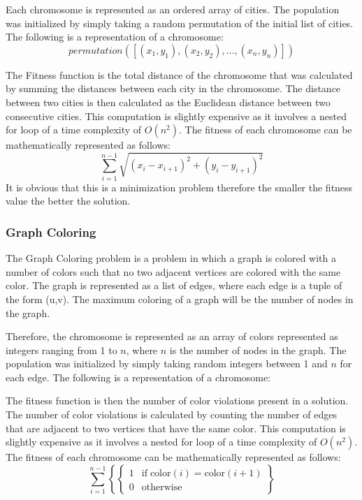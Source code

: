\documentclass[11pt, letterpaper]{article}
\begin{document}
Each chromosome is represented as an ordered array of cities. The population was initialized by simply taking a random permutation of the initial list of cities. The following is a representation of a chromosome: 
$$permutation([(x_1, y_1), (x_2,y_2), \dots, (x_n, y_n)])$$

The Fitness function is the total distance of the chromosome that was calculated by summing the distances between each city in the chromosome. The distance between two cities is then calculated as the Euclidean distance between two consecutive cities. This computation is slightly expensive as it involves a nested for loop of a time complexity of $O(n^2)$. The fitness of each chromosome can be mathematically represented as follows:
$$\sum_{i=1}^{n-1} \sqrt{(x_i - x_{i+1})^2 + (y_i - y_{i+1})^2}$$
It is obvious that this is a minimization problem therefore the smaller the fitness value the better the solution.

\subsubsection{Graph Coloring}
The Graph Coloring problem is a problem in which a graph is colored with a number of colors such that no two adjacent vertices are colored with the same color. The graph is represented as a list of edges, where each edge is a tuple of the form (u,v). The maximum coloring of a graph will be the number of nodes in the graph.

Therefore, the chromosome is represented as an array of colors represented as integers ranging from 1 to $n$, where $n$ is the number of nodes in the graph. The population was initialized by simply taking random integers between 1 and $n$ for each edge. The following is a representation of a chromosome:

The fitness function is then the number of color violations present in a solution. The number of color violations is calculated by counting the number of edges that are adjacent to two vertices that have the same color. This computation is slightly expensive as it involves a nested for loop of a time complexity of $O(n^2)$. The fitness of each chromosome can be mathematically represented as follows:
$$\sum_{i=1}^{n-1} \left\{ \left\{ \begin{array}{ll} 1 & \text{if} \; \text{color}(i) = \text{color}(i+1) \\ 0 & \text{otherwise} \end{array} \right. \right\}$$
\end{document}
